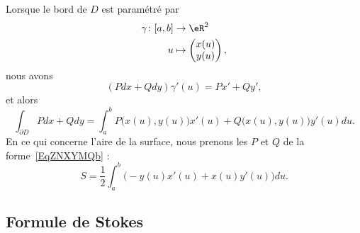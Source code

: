 Lorsque le bord de \( D\) est paramétré par
\begin{equation}
	\begin{aligned}
		\gamma\colon \mathopen[ a , b \mathclose] & \to \eR^2              \\
		u                                         & \mapsto \begin{pmatrix}
			                                                    x(u) \\
			                                                    y(u)
		                                                    \end{pmatrix},
	\end{aligned}
\end{equation}
nous avons
\begin{equation}
	(Pdx+Qdy)\gamma'(u)=Px'+Qy',
\end{equation}
et alors
\begin{equation}
	\int_{\partial D}Pdx+Qdy=\int_a^b P\big( x(u),y(u) \big)x'(u)+Q\big( x(u),y(u) \big)y'(u)du.
\end{equation}
En ce qui concerne l'aire de la surface, nous prenons les \( P\) et \( Q\) de la forme~\ref{EqZNXYMQb} :
\begin{equation}    \label{EqAJGrtOk}
	S=\frac{ 1 }{2}\int_a^b\Big( -y(u)x'(u)+x(u)y'(u) \Big)du.
\end{equation}

\subsection{Formule de Stokes}
\label{secstokesusuel}

